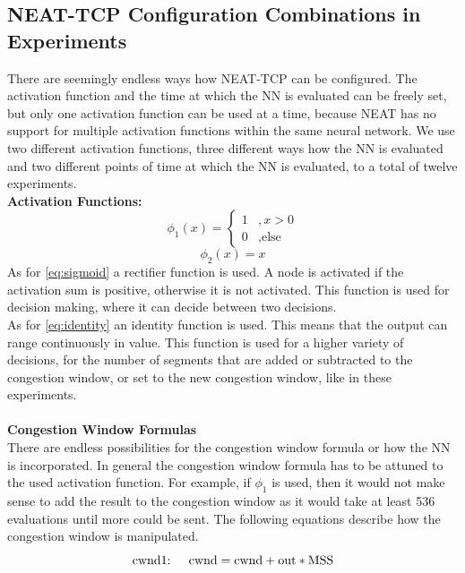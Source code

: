 \subsection{NEAT-TCP Configuration Combinations in Experiments}\label{subsec:configurations}
There are seemingly endless ways how NEAT-TCP can be configured. The activation function and the time at which the NN is evaluated can be freely set, but only one activation function can be used at a time, because NEAT has no support for multiple activation functions within the same neural network. We use two different activation functions, three different ways how the NN is evaluated and two different points of time at which the NN is evaluated, to a total of twelve experiments.\\
\textbf{Activation Functions:} 
\begin{equation}\label{eq:sigmoid}
\phi_1(x)=\left\{\begin{matrix}
1 & , x> 0\\ 
 0 & , \text{else}
\end{matrix}\right.
\end{equation}
\begin{equation}\label{eq:identity}
\phi_2(x)=x
\end{equation}
As for \autoref{eq:sigmoid} a rectifier function is used. A node is activated if the activation sum is positive, otherwise it is not activated. This function is used for decision making, where it can decide between two decisions. \\
As for \autoref{eq:identity} an identity function is used. This means that the output can range continuously in value. This function is used for a higher variety of decisions, for the number of segments that are added or subtracted to the congestion window, or set to the new congestion window, like in these experiments.\\\\
\textbf{Congestion Window Formulas}\\
There are endless possibilities for the congestion window formula or how the NN is incorporated.
In general the congestion window formula has to be attuned to the used activation function.
For example, if $\phi_1$ is used, then it would not make sense to add the result to the congestion window as it would take at least 536 evaluations until more could be sent.
The following equations describe how the congestion window is manipulated.
\begin{equation}\label{eq:add}
\text{cwnd1: \quad} \text{cwnd} = \text{cwnd} + \text{out} * \text{MSS}	
\end{equation}

